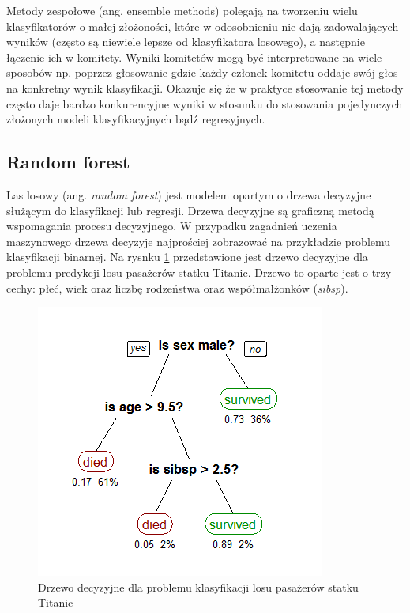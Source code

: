 \documentclass[a4paper, twoside, 11pt, openright]{article}
\begin{document}
Metody zespołowe (ang. ensemble methods) polegają na tworzeniu wielu klasyfikatorów o małej złożoności, które w odosobnieniu nie dają zadowalających wyników (często są niewiele lepsze od klasyfikatora losowego), a następnie łączenie ich w komitety. Wyniki komitetów mogą być interpretowane na wiele sposobów np. poprzez głosowanie gdzie każdy członek komitetu oddaje swój głos na konkretny wynik klasyfikacji. Okazuje się że w praktyce stosowanie tej metody często daje bardzo konkurencyjne wyniki w stosunku do stosowania pojedynczych złożonych modeli klasyfikacyjnych bądź regresyjnych.

\subsection{Random forest \cite{randforest}}

Las losowy (ang. \textit{random forest}) jest modelem opartym o drzewa decyzyjne służącym do klasyfikacji lub regresji. Drzewa decyzyjne są graficzną metodą wspomagania procesu decyzyjnego. W przypadku zagadnień uczenia maszynowego drzewa decyzyje najprościej zobrazować na przykładzie problemu klasyfikacji binarnej. Na rysnku \ref{wiki_dec_tree} przedstawione jest drzewo decyzyjne dla problemu predykcji losu pasażerów statku Titanic. Drzewo to oparte jest o trzy cechy: płeć, wiek oraz liczbę rodzeństwa oraz współmałżonków (\textit{sibsp}). 

\begin{figure}[H]
\centering \includegraphics[scale=0.6]{img/decision_tree.png}
\caption{Drzewo decyzyjne dla problemu klasyfikacji losu pasażerów statku Titanic \cite{wikidecisiontree}}
\label{wiki_dec_tree}
\end{figure}
\end{document}
